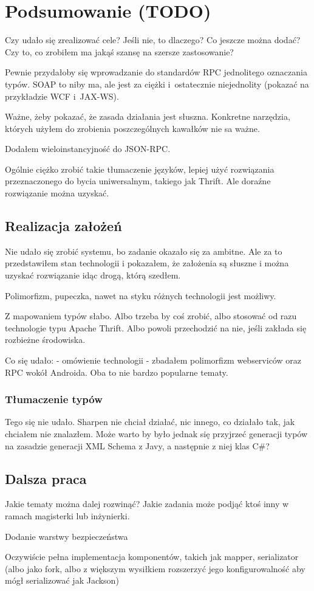 \chapter{Podsumowanie (TODO)}
Czy udało się zrealizować cele? Jeśli nie, to dlaczego? Co jeszcze można dodać? Czy to, co zrobiłem ma jakąś szansę na szersze zastosowanie?

Pewnie przydałoby się wprowadzanie do standardów RPC jednolitego oznaczania typów. SOAP to niby ma, ale jest za ciężki i~ostatecznie niejednolity (pokazać na przykładzie WCF i~JAX-WS).

Ważne, żeby pokazać, że zasada działania jest słuszna. Konkretne narzędzia, których użyłem do zrobienia poszczególnych kawałków nie sa ważne.

Dodałem wieloinstancyjność do JSON-RPC.

Ogólnie ciężko zrobić takie tłumaczenie języków, lepiej użyć rozwiązania przeznaczonego do bycia uniwersalnym, takiego jak Thrift.
Ale doraźne rozwiązanie można uzyskać.


\section{Realizacja założeń}
Nie udało się zrobić systemu, bo zadanie okazało się za ambitne. Ale za to przedstawiłem stan technologii i pokazałem, że założenia są słuszne i można uzyskać rozwiązanie idąc drogą, którą szedłem.

Polimorfizm, pupeczka, nawet na styku różnych technologii jest możliwy.

Z mapowaniem typów słabo. Albo trzeba by coś zrobić, albo stosować od razu technologie typu Apache Thrift. Albo powoli przechodzić na nie, jeśli zakłada się rozbieżne środowiska.

Co się udało:
- omówienie technologii - zbadałem polimorfizm webserviców oraz RPC wokół Androida. Oba to nie bardzo popularne tematy.

\subsection{Tłumaczenie typów}
Tego się nie udało. Sharpen nie chciał działać, nic innego, co działało tak, jak chciałem nie znalazłem. Może warto by było jednak się przyjrzeć generacji typów na zasadzie generacji XML Schema z Javy, a następnie z niej klas C\#?

\section{Dalsza praca}
Jakie tematy można dalej rozwinąć? Jakie zadania może podjąć ktoś inny w ramach magisterki lub inżynierki.

Dodanie warstwy bezpieczeństwa 

Oczywiście pełna implementacja komponentów, takich jak mapper, serializator (albo jako fork, albo z większym wysiłkiem rozszerzyć jego konfigurowalność aby mógł serializować jak Jackson)

